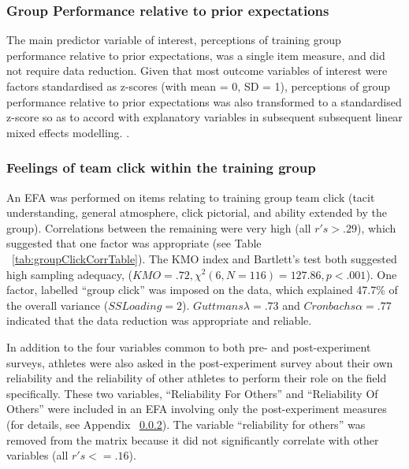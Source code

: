 \subsubsection{Group Performance relative to prior expectations}
The main predictor variable of interest, perceptions of training group performance relative to prior expectations, was a single item measure, and did not require data reduction.  Given that most outcome variables of interest were factors standardised as z-scores (with mean = 0, SD = 1), perceptions of group performance relative to prior expectations was also transformed to a standardised z-score so as to accord with explanatory variables in subsequent subsequent linear mixed effects modelling. \citep[for an explanation, see][]{}.

\subsubsection{Feelings of team click within the training group}
An EFA was performed on items relating to training group team click (tacit understanding, general atmosphere, click pictorial, and ability extended by the group).  Correlations between the remaining were very high (all $r's > .29$), which suggested that one factor was appropriate (see Table ~\ref{tab:groupClickCorrTable}). The KMO index and Bartlett's test both suggested high sampling adequacy, ($KMO =  .72, \chi^2(6, N = 116) = 127.86, p < .001$). One factor, labelled ``group click'' was imposed on the data, which explained 47.7\% of the overall variance ($SS Loading = 2$). $Guttmans \lambda = .73$ and $Cronbachs \alpha = .77$ indicated that the data reduction was appropriate and reliable.

\begin{landscape}
\centering
  
 \end{landscape}
\restoregeometry


In addition to the four variables common to both pre- and post-experiment surveys, athletes were also asked in the post-experiment survey about their own reliability and the reliability of other athletes to perform their role on the field specifically. These two variables, ``Reliability For Others'' and ``Reliability Of Others'' were included in an EFA involving only the post-experiment measures (for details, see Appendix ~\ref{}).  The variable ``reliability for others'' was removed from the matrix because it did not significantly correlate with other variables (all $r's <= .16$).


